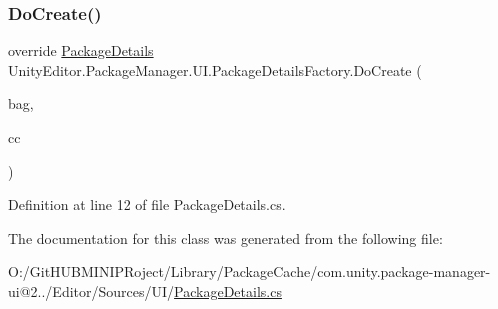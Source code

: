 \subsubsection{\texorpdfstring{DoCreate()}{DoCreate()}}
{\footnotesize\ttfamily override \mbox{\hyperlink{class_unity_editor_1_1_package_manager_1_1_u_i_1_1_package_details}{Package\+Details}} Unity\+Editor.\+Package\+Manager.\+U\+I.\+Package\+Details\+Factory.\+Do\+Create (\begin{DoxyParamCaption}\item[{I\+Uxml\+Attributes}]{bag,  }\item[{Creation\+Context}]{cc }\end{DoxyParamCaption})\hspace{0.3cm}{\ttfamily [protected]}}



Definition at line 12 of file Package\+Details.\+cs.



The documentation for this class was generated from the following file\+:\begin{DoxyCompactItemize}
\item 
O\+:/\+Git\+H\+U\+B\+M\+I\+N\+I\+P\+Roject/\+Library/\+Package\+Cache/com.\+unity.\+package-\/manager-\/ui@2../\+Editor/\+Sources/\+U\+I/\mbox{\hyperlink{_package_details_8cs}{Package\+Details.\+cs}}\end{DoxyCompactItemize}
